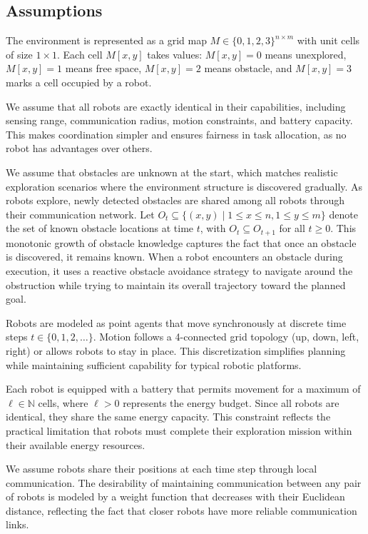 \subsection*{Assumptions}

The environment is represented as a grid map $M \in \{0,1,2,3\}^{n \times m}$ with unit cells of size $1\times 1$. Each cell $M[x,y]$ takes values: $M[x,y]=0$ means unexplored, $M[x,y]=1$ means free space, $M[x,y]=2$ means obstacle, and $M[x,y]=3$ marks a cell occupied by a robot.

We assume that all robots are exactly identical in their capabilities, including sensing range, communication radius, motion constraints, and battery capacity. This makes coordination simpler and ensures fairness in task allocation, as no robot has advantages over others.

We assume that obstacles are unknown at the start, which matches realistic exploration scenarios where the environment structure is discovered gradually. As robots explore, newly detected obstacles are shared among all robots through their communication network. Let $O_t \subseteq \{(x,y) \mid 1 \le x \le n, 1 \le y \le m\}$ denote the set of known obstacle locations at time $t$, with $O_t \subseteq O_{t+1}$ for all $t \ge 0$. This monotonic growth of obstacle knowledge captures the fact that once an obstacle is discovered, it remains known. When a robot encounters an obstacle during execution, it uses a reactive obstacle avoidance strategy to navigate around the obstruction while trying to maintain its overall trajectory toward the planned goal.

Robots are modeled as point agents that move synchronously at discrete time steps $t \in \{0,1,2,\ldots\}$. Motion follows a 4-connected grid topology (up, down, left, right) or allows robots to stay in place. This discretization simplifies planning while maintaining sufficient capability for typical robotic platforms.

Each robot is equipped with a battery that permits movement for a maximum of $\ell \in \mathbb{N}$ cells, where $\ell > 0$ represents the energy budget. Since all robots are identical, they share the same energy capacity. This constraint reflects the practical limitation that robots must complete their exploration mission within their available energy resources.

We assume robots share their positions at each time step through local communication. The desirability of maintaining communication between any pair of robots is modeled by a weight function that decreases with their Euclidean distance, reflecting the fact that closer robots have more reliable communication links.

